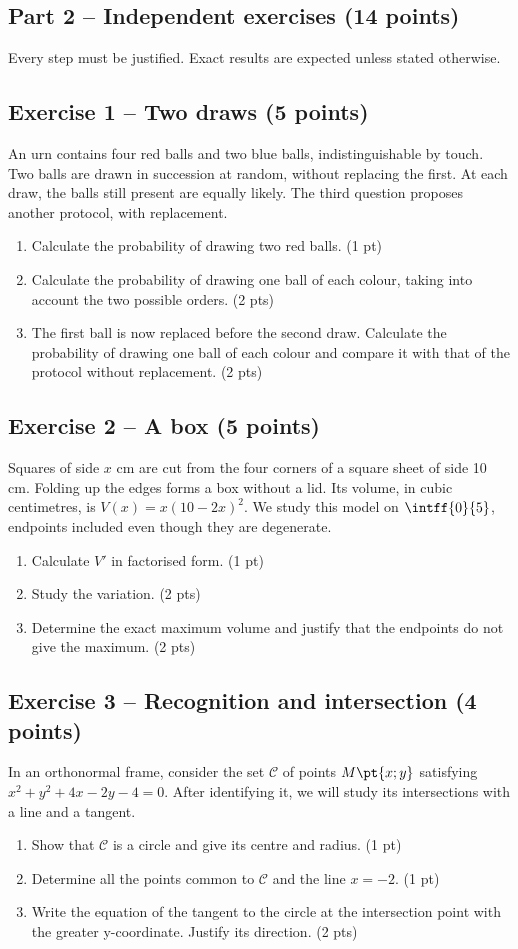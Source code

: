\mxnewpage\subsection*{Part 2 -- Independent exercises (14 points)}
Every step must be justified. Exact results are expected unless stated otherwise.
\subsection*{Exercise 1 -- Two draws (5 points)}
An urn contains four red balls and two blue balls, indistinguishable by touch. Two balls are drawn in succession at random, without replacing the first. At each draw, the balls still present are equally likely. The third question proposes another protocol, with replacement.
\begin{enumerate}
\item Calculate the probability of drawing two red balls. \hfill(1 pt)
\item Calculate the probability of drawing one ball of each colour, taking into account the two possible orders. \hfill(2 pts)
\item The first ball is now replaced before the second draw. Calculate the probability of drawing one ball of each colour and compare it with that of the protocol without replacement. \hfill(2 pts)
\end{enumerate}
\subsection*{Exercise 2 -- A box (5 points)}
Squares of side $x$ cm are cut from the four corners of a square sheet of side 10 cm. Folding up the edges forms a box without a lid. Its volume, in cubic centimetres, is $V(x)=x(10-2x)^2$. We study this model on $\intff{0}{5}$, endpoints included even though they are degenerate.
\begin{enumerate}
\item Calculate $V\prime$ in factorised form. \hfill(1 pt)
\item Study the variation. \hfill(2 pts)
\item Determine the exact maximum volume and justify that the endpoints do not give the maximum. \hfill(2 pts)
\end{enumerate}
\subsection*{Exercise 3 -- Recognition and intersection (4 points)}
In an orthonormal frame, consider the set $\mathcal C$ of points $M\pt{x;y}$ satisfying $x^2+y^2+4x-2y-4=0$. After identifying it, we will study its intersections with a line and a tangent.
\begin{enumerate}
\item Show that $\mathcal C$ is a circle and give its centre and radius. \hfill(1 pt)
\item Determine all the points common to $\mathcal C$ and the line $x=-2$. \hfill(1 pt)
\item Write the equation of the tangent to the circle at the intersection point with the greater y-coordinate. Justify its direction. \hfill(2 pts)
\end{enumerate}
